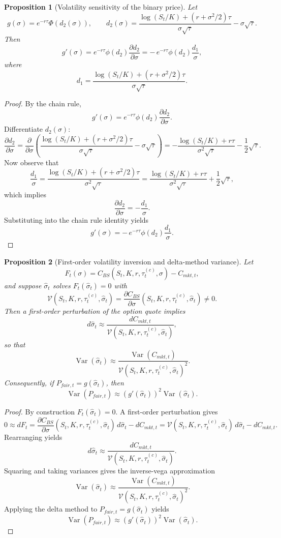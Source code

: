 \documentclass[11pt]{article}
\numberwithin{equation}{section}
\theoremstyle{plain}
\newtheorem{proposition}{Proposition}[section]
\begin{document}
\begin{proposition}[Volatility sensitivity of the binary price]
\label{prop:digital-sensitivity}
Let
\[
g(\sigma)=e^{-r\tau}\Phi(d_2(\sigma)),
\qquad
d_2(\sigma)=\frac{\log(S_t/K)+(r+\sigma^2/2)\tau}{\sigma\sqrt{\tau}}-\sigma\sqrt{\tau}.
\]
Then
\[
g'(\sigma)
=
e^{-r\tau}\phi(d_2)\frac{\partial d_2}{\partial \sigma}
=
-\,e^{-r\tau}\phi(d_2)\frac{d_1}{\sigma},
\]
where
\[
d_1=\frac{\log(S_t/K)+(r+\sigma^2/2)\tau}{\sigma\sqrt{\tau}}.
\]
\end{proposition}

\begin{proof}
By the chain rule,
\[
g'(\sigma)=e^{-r\tau}\phi(d_2)\frac{\partial d_2}{\partial \sigma}.
\]
Differentiate $d_2(\sigma)$:
\[
\frac{\partial d_2}{\partial \sigma}
=
\frac{\partial}{\partial \sigma}
\left(
\frac{\log(S_t/K)+(r+\sigma^2/2)\tau}{\sigma\sqrt{\tau}}-\sigma\sqrt{\tau}
\right)
=
-\frac{\log(S_t/K)+r\tau}{\sigma^2\sqrt{\tau}}-\frac{1}{2}\sqrt{\tau}.
\]
Now observe that
\[
\frac{d_1}{\sigma}
=
\frac{\log(S_t/K)+(r+\sigma^2/2)\tau}{\sigma^2\sqrt{\tau}}
=
\frac{\log(S_t/K)+r\tau}{\sigma^2\sqrt{\tau}}+\frac{1}{2}\sqrt{\tau},
\]
which implies
\[
\frac{\partial d_2}{\partial \sigma}=-\frac{d_1}{\sigma}.
\]
Substituting into the chain rule identity yields
\[
g'(\sigma)=-\,e^{-r\tau}\phi(d_2)\frac{d_1}{\sigma}.
\]
\end{proof}

\begin{proposition}[First-order volatility inversion and delta-method variance]
\label{prop:iv-delta}
Let
\[
F_t(\sigma)=C_{BS}(S_t,K,r,\tau_t^{(c)},\sigma)-C_{mkt,t},
\]
and suppose $\hat{\sigma}_t$ solves $F_t(\hat{\sigma}_t)=0$ with
\[
\mathcal{V}(S_t,K,r,\tau_t^{(c)},\hat{\sigma}_t)
=
\frac{\partial C_{BS}}{\partial \sigma}(S_t,K,r,\tau_t^{(c)},\hat{\sigma}_t)\neq 0.
\]
Then a first-order perturbation of the option quote implies
\[
d\hat{\sigma}_t
\approx
\frac{dC_{mkt,t}}{\mathcal{V}(S_t,K,r,\tau_t^{(c)},\hat{\sigma}_t)},
\]
so that
\[
\operatorname{Var}(\hat{\sigma}_t)
\approx
\frac{\operatorname{Var}(C_{mkt,t})}
{\mathcal{V}(S_t,K,r,\tau_t^{(c)},\hat{\sigma}_t)^2}.
\]
Consequently, if $P_{fair,t}=g(\hat{\sigma}_t)$, then
\[
\operatorname{Var}(P_{fair,t})
\approx
\left(g'(\hat{\sigma}_t)\right)^2
\operatorname{Var}(\hat{\sigma}_t).
\]
\end{proposition}

\begin{proof}
By construction $F_t(\hat{\sigma}_t)=0$. A first-order perturbation gives
\[
0\approx dF_t
=
\frac{\partial C_{BS}}{\partial \sigma}(S_t,K,r,\tau_t^{(c)},\hat{\sigma}_t)\,d\hat{\sigma}_t-dC_{mkt,t}
=
\mathcal{V}(S_t,K,r,\tau_t^{(c)},\hat{\sigma}_t)\,d\hat{\sigma}_t-dC_{mkt,t}.
\]
Rearranging yields
\[
d\hat{\sigma}_t\approx \frac{dC_{mkt,t}}{\mathcal{V}(S_t,K,r,\tau_t^{(c)},\hat{\sigma}_t)}.
\]
Squaring and taking variances gives the inverse-vega approximation
\[
\operatorname{Var}(\hat{\sigma}_t)
\approx
\frac{\operatorname{Var}(C_{mkt,t})}
{\mathcal{V}(S_t,K,r,\tau_t^{(c)},\hat{\sigma}_t)^2}.
\]
Applying the delta method to $P_{fair,t}=g(\hat{\sigma}_t)$ yields
\[
\operatorname{Var}(P_{fair,t})
\approx
\left(g'(\hat{\sigma}_t)\right)^2\operatorname{Var}(\hat{\sigma}_t).
\]
\end{proof}
\end{document}
